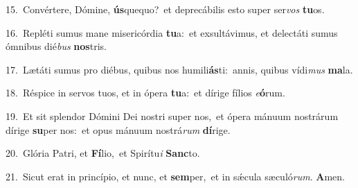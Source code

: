{\numbfont\textcolor{\numbcolor}{15.}}~Convértere, Dómine, \textbf{ús}\-quequo?~\star et deprecábilis esto super ser\textit{vos} \textbf{tu}\-os.\par
{\numbfont\textcolor{\numbcolor}{16.}}~Repléti sumus mane misericórdia \textbf{tu}\-a:~\star et exsultávimus, et delectáti sumus ómnibus dié\textit{bus} \textbf{nos}\-tris.\par
{\numbfont\textcolor{\numbcolor}{17.}}~Lætáti sumus pro diébus, quibus nos humili\-\textbf{ás}\-ti:~\star annis, quibus vídi\textit{mus} \textbf{ma}\-la.\par
{\numbfont\textcolor{\numbcolor}{18.}}~Réspice in servos tuos, et in ópera \textbf{tu}\-a:~\star et dírige fílios \textit{e}\-\textbf{ó}rum.\par
{\numbfont\textcolor{\numbcolor}{19.}}~Et sit splendor Dómini Dei nostri super nos,~\dagger et ópera mánuum nostrárum dírige \textbf{su}\-per nos:~\star et opus mánuum nostrá\textit{rum} \textbf{dí}\-rige.\par
{\numbfont\textcolor{\numbcolor}{20.}}~Glória Patri, et \textbf{Fí}\-lio,~\star et Spirítu\textit{i} \textbf{Sanc}\-to.\par
{\numbfont\textcolor{\numbcolor}{21.}}~Sicut erat in princípio, et nunc, et \textbf{sem}\-per,~\star et in sǽcula sæculó\-\textit{rum}\-. \textbf{A}\-men.\par
